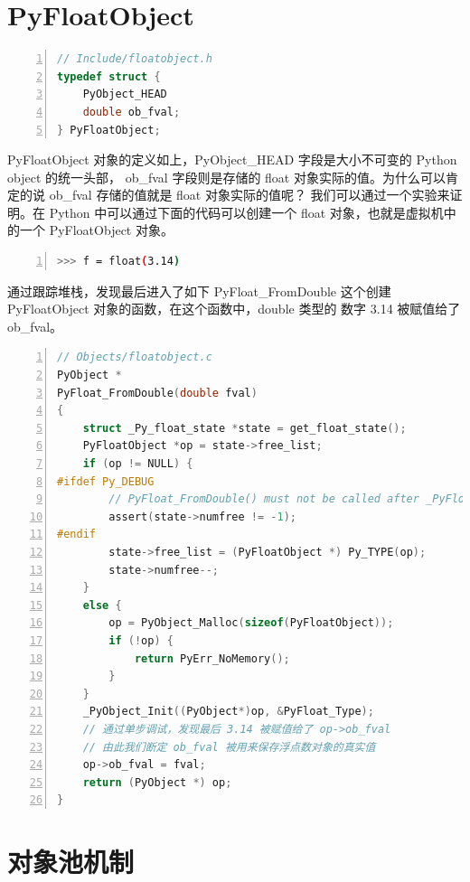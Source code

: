 \section{PyFloatObject}

\begin{lstlisting}[language=C, numbers=left, numbersep=1em, numberstyle=\footnotesize , breaklines=true]
// Include/floatobject.h
typedef struct {
    PyObject_HEAD
    double ob_fval;
} PyFloatObject;
\end{lstlisting}

PyFloatObject 对象的定义如上，PyObject\_HEAD 字段是大小不可变的 Python object 的统一头部，
ob\_fval 字段则是存储的 float 对象实际的值。为什么可以肯定的说 ob\_fval 存储的值就是 float 对象实际的值呢？ 
我们可以通过一个实验来证明。在 Python 中可以通过下面的代码可以创建一个 float 对象，也就是虚拟机中的一个 PyFloatObject 对象。

\begin{lstlisting}[language=bash, numbers=left, numbersep=1em, numberstyle=\footnotesize , breaklines=true]
>>> f = float(3.14)
\end{lstlisting}

通过跟踪堆栈，发现最后进入了如下 PyFloat\_FromDouble 这个创建 PyFloatObject 对象的函数，在这个函数中，double 类型的
数字 3.14 被赋值给了 ob\_fval。

\begin{lstlisting}[language=C, numbers=left, numbersep=1em, numberstyle=\footnotesize , breaklines=true]
// Objects/floatobject.c
PyObject *
PyFloat_FromDouble(double fval)
{
    struct _Py_float_state *state = get_float_state();
    PyFloatObject *op = state->free_list;
    if (op != NULL) {
#ifdef Py_DEBUG
        // PyFloat_FromDouble() must not be called after _PyFloat_Fini()
        assert(state->numfree != -1);
#endif
        state->free_list = (PyFloatObject *) Py_TYPE(op);
        state->numfree--;
    }
    else {
        op = PyObject_Malloc(sizeof(PyFloatObject));
        if (!op) {
            return PyErr_NoMemory();
        }
    }
    _PyObject_Init((PyObject*)op, &PyFloat_Type);
    // 通过单步调试，发现最后 3.14 被赋值给了 op->ob_fval
    // 由此我们断定 ob_fval 被用来保存浮点数对象的真实值
    op->ob_fval = fval;
    return (PyObject *) op;
}
\end{lstlisting}

\section{对象池机制}

